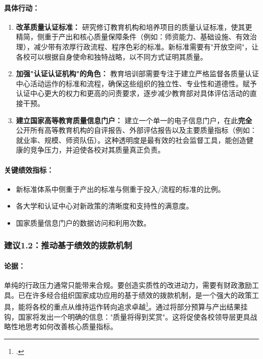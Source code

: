 \paragraph{具体行动：}
\begin{enumerate}
    \item \textbf{改革质量认证标准：} 研究修订教育机构和培养项目的质量认证标准，使其更精简，侧重于产出和核心质量保障条件（例如：师资能力、基础设施、有效治理），减少带有浓厚行政流程、程序色彩的标准。新标准需要有"开放空间"，让各校可以根据自身使命和独特战略，以不同方式证明其质量。
    
    \item \textbf{加强"认证认证机构"的角色：} 教育培训部需要专注于建立严格监督各质量认证中心活动运作的标准和流程，确保这些组织的独立性、专业性和道德性。赋予认证中心更大的权力和更高的问责要求，逐步减少教育部对具体评估活动的直接干预。
    
    \item \textbf{建立国家高等教育质量信息门户：} 建立一个单一的电子信息门户，在此\textbf{完全}公开所有高等教育机构的自评报告、外部评估报告以及主要质量指标（例如：就业率、规模、师资队伍）。这种透明度是最有效的社会监督工具，能创造健康的竞争压力，并迫使各校对其质量真正负责。
\end{enumerate}

\paragraph{关键绩效指标：}
\begin{itemize}
    \item 新标准体系中侧重于产出的标准与侧重于投入/流程的标准的比例。
    \item 各大学和认证中心对新政策的清晰度和支持性的满意度。
    \item 国家质量信息门户的数据访问和利用次数。
\end{itemize}

\subsubsection{建议1.2：推动基于绩效的拨款机制}

\paragraph{论据：}
单纯的行政压力通常只能带来合规。要创造实质性的改进动力，需要有财政激励工具。已在许多经合组织国家成功应用的基于绩效的拨款机制，是一个强大的政策工具，能将各校的重点从维持运作转向追求卓越\footcite{oecd_pbf_2021}。通过将部分预算与产出结果挂钩，国家将发出一个明确的信息："质量将得到奖赏"。这将促使各校领导层更具战略性地思考如何改善核心质量指标。

